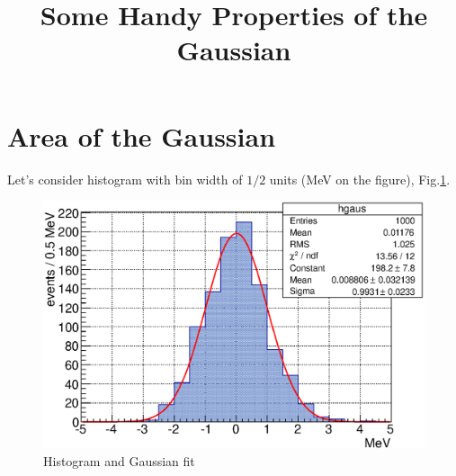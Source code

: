 \documentclass[english]{article}
\makeatletter
\def\ScaleIfNeeded{%
\ifdim\Gin@nat@width>\linewidth
\linewidth
\else
\Gin@nat@width
\fi
}
\makeatother
\begin{document}
\title{Some Handy Properties of the Gaussian}

\maketitle

\section{Area of the Gaussian}

Let's consider histogram with bin width of $1/2$ units (MeV on the figure), Fig.\ref{fig:hgaus}.

\begin{figure}[h]
\centering
\begin{minipage}[t]{1.0 \linewidth}
\includegraphics[width=\ScaleIfNeeded]{hgaus.eps}
\caption{Histogram and Gaussian fit}
\label{fig:hgaus}
\end{minipage}
\end{figure}
\end{document}
